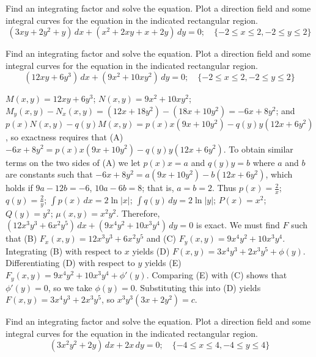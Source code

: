 \documentclass{ximera}
\begin{document}
\begin{problem}\label{exer:2.6.25}Find an integrating factor and solve the  equation. Plot a direction field and some integral curves for the equation in the indicated rectangular region.
$$(3xy+2y^2+y)\,dx+(x^2+2xy+x+2y)\,dy=0;   \quad \{-2\leq x\leq 2,-2\leq y\leq 2\}$$
\end{problem}

\begin{problem}\label{exer:2.6.26} Find an integrating factor and solve the  equation. Plot a direction field and some integral curves for the equation in the indicated rectangular region.
$$(12 xy+6y^3)\,dx+(9x^2+10xy^2)\,dy=0;   \quad \{-2\leq x\leq 2,-2\leq y\leq 2\}$$



\begin{solution}
    $M(x,y)=12xy+6y^3$;\;
$N(x,y)=9x^2+10xy^2$;\;
 $M_y(x,y)-N_x(x,y)=(12x+18y^2)-(18x+10y^2)=-6x+8y^2$;
and  $p(x)N(x,y)-q(y)M(x,y)=p(x)x(9x+10y^2)-q(y)y(12x+6y^2)$,
so exactness requires that
(A) $-6x+8y^2=p(x)x(9x+10y^2)-q(y)y(12x+6y^2)$.
To obtain  similar terms on the two sides of (A)
we let  $p(x)x=a$ and $q(y)y=b$  where $a$ and $b$ are constants
such that $-6x+8y^2=a(9x+10y^2)-b(12x+6y^2)$, which holds if
  $9a-12b=-6$, $10a-6b=8$; that is, $a=b=2$. Thus
 $p(x)=\frac{2}{ x}$;\;
 $q(y)=\frac{2}{ y}$;\;
$\int p(x)\,dx=2\ln|x|$;\;
$\int q(y)\,dy=2\ln|y|$;\;
$P(x)=x^2$;
$Q(y)=y^2$;
$\mu(x,y)=x^2y^2$.
Therefore,
$(12x^3y^3+6x^2y^5)\,dx+(9x^4y^2+10x^3y^4)\,dy=0$
is exact.
We must find $F$ such that
(B) $F_x(x,y)=12x^3y^3+6x^2y^5$ and
(C) $F_y(x,y)=9x^4y^2+10x^3y^4$.
Integrating (B) with respect to $x$ yields
(D) $F(x,y)=3x^4y^3+2x^3y^5+\phi(y)$.
Differentiating (D) with respect to $y$  yields
(E) $F_y(x,y)=9x^4y^2+10x^3y^4+\phi'(y)$.
Comparing (E) with (C)  shows that
$\phi'(y)=0$, so we take
$\phi(y)=0$.
Substituting this into (D) yields
$F(x,y)=3x^4y^3+2x^3y^5$,
so $x^3y^3(3x+2y^2)=c$.

\end{solution}
\end{problem}

\begin{problem}\label{exer:2.6.27} Find an integrating factor and solve the  equation. Plot a direction field and some integral curves for the equation in the indicated rectangular region.
$$(3x^2y^2+2y)\,dx+ 2x\,dy=0;   \quad \{-4\leq x\leq 4,-4\leq y\leq 4\}$$
\end{problem}
\end{document}
